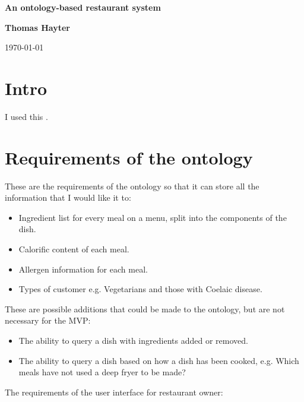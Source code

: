\documentclass{article}
\begin{document}
\begin{titlepage}
\begin{center}
\vspace*{5cm}

\Huge
\textbf{An ontology-based restaurant system}

\vspace{1cm}

\Large
\textbf{Thomas Hayter}

\vspace{1cm}

\today
\end{center}
\end{titlepage}

\tableofcontents

\section{Intro}
I used this \cite{pizza_tutorial_pdf}.

\section{Requirements of the ontology}

These are the requirements of the ontology so that it can store all the information that I would like it to:

\begin{itemize}
\item Ingredient list for every meal on a menu, split into the components of the dish.
\item Calorific content of each meal.
\item Allergen information for each meal.
\item Types of customer e.g. Vegetarians and those with Coelaic disease.
\end{itemize}

These are possible additions that could be made to the ontology, but are not necessary for the MVP:

\begin{itemize}
\item The ability to query a dish with ingredients added or removed.
\item The ability to query a dish based on how a dish has been cooked, e.g. Which meals have not used a deep fryer to be made?
\end{itemize}

The requirements of the user interface for restaurant owner:
\end{document}
